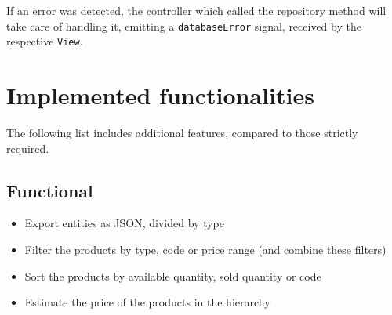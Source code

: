 \documentclass[10pt]{article}
\begin{document}
If an error was detected, the controller which called the repository method
will take care of handling it, emitting a \texttt{databaseError} signal,
received by the respective \texttt{View}.

\section{Implemented functionalities}
The following list includes additional features, compared to those strictly
required.
\subsection{Functional}
\begin{itemize}
    \item Export entities as JSON, divided by type
    \item Filter the products by type, code or price range (and combine these filters)
    \item Sort the products by available quantity, sold quantity or code
    \item Estimate the price of the products in the hierarchy
\end{itemize}
\end{document}
